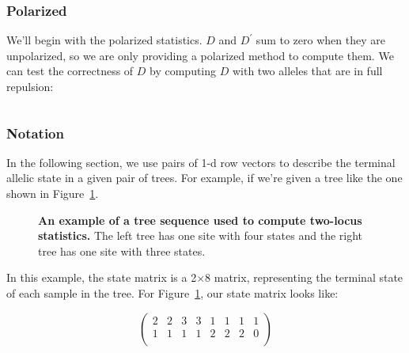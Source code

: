\documentclass[12pt]{article}
\begin{document}
\subsubsection{Polarized}
We'll begin with the polarized statistics. $D$ and $D^{\prime}$ sum to zero when
they are unpolarized, so we are only providing a polarized method to compute
them. We can test the correctness of $D$ by computing $D$ with two alleles that
are in full repulsion:

\[
\]

\subsubsection{Notation}

In the following section, we use pairs of 1-d row vectors to describe the
terminal allelic state in a given pair of trees. For example, if we're given a
tree like the one shown in Figure~\ref{fig:example_tree}.

\begin{figure}
    \centering
    
    \caption{
      \textbf{An example of a tree sequence used to compute two-locus statistics.}
      The left tree has one site with four states and the right tree has one
      site with three states.
    }
\label{fig:example_tree}
\end{figure}

In this example, the state matrix is a 2$\times$8 matrix, representing the
terminal state of each sample in the tree. For Figure~\ref{fig:example_tree},
our state matrix looks like:

\[
  \left(
    \begin{array}{cccccccc}
      2 & 2 & 3 & 3 & 1 & 1 & 1 & 1 \\
      1 & 1 & 1 & 1 & 2 & 2 & 2 & 0 \\
    \end{array}
  \right)
\]



\end{document}
